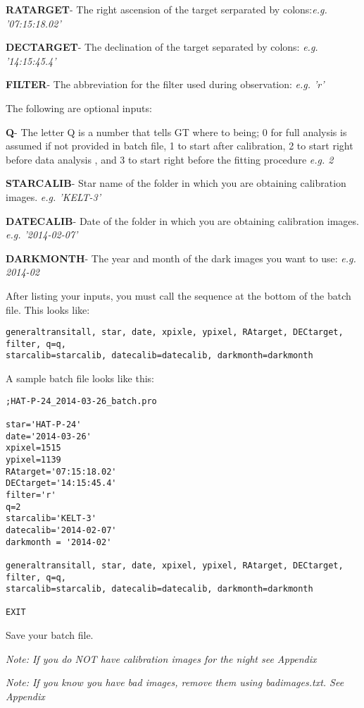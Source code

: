 \documentclass[10pt,preprint]{aastex}
\begin{document}
\textbf{RATARGET}- 
The right ascension of the target serparated by colons:\emph{e.g. '07:15:18.02'}

\textbf{DECTARGET}- 
The declination of the target separated by colons: \emph{e.g. '14:15:45.4'}

\textbf{FILTER}- 
The abbreviation for the filter used during observation: \emph{e.g. 'r'}

The following are optional inputs:

\textbf{Q}- 
The letter Q is a number that tells GT where to being; 0 for full analysis is assumed if not
 provided in batch file, 1 to start after calibration, 2 to start right before data analysis
, and 3 to start right before the fitting procedure \emph{e.g. 2}

\textbf{STARCALIB}-  
Star name of the folder in which you are obtaining calibration images. \emph{e.g. 'KELT-3'}

\textbf{DATECALIB}- 
Date of the folder in which you are obtaining calibration images. \emph{e.g. '2014-02-07'}

\textbf{DARKMONTH}-
The year and month of the dark images you want to use: \emph{e.g. 2014-02}

After listing your inputs, you must call the sequence at the bottom of the batch file. This looks
like:
\begin{verbatim}
generaltransitall, star, date, xpixle, ypixel, RAtarget, DECtarget, filter, q=q,
starcalib=starcalib, datecalib=datecalib, darkmonth=darkmonth
\end{verbatim}

A sample batch file looks like this:

\begin{verbatim}
;HAT-P-24_2014-03-26_batch.pro

star='HAT-P-24'
date='2014-03-26'
xpixel=1515
ypixel=1139
RAtarget='07:15:18.02'
DECtarget='14:15:45.4'
filter='r'
q=2
starcalib='KELT-3'
datecalib='2014-02-07'
darkmonth = '2014-02'

generaltransitall, star, date, xpixel, ypixel, RAtarget, DECtarget, filter, q=q, 
starcalib=starcalib, datecalib=datecalib, darkmonth=darkmonth

EXIT
\end{verbatim}

Save your batch file. 

\emph{Note: If you do NOT have calibration images for the night see Appendix}

\emph{Note: If you know you have bad images, remove them using badimages.txt. See Appendix}
\end{document}
